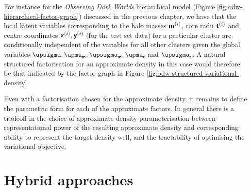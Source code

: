 For instance for the \emph{Observing Dark Worlds} hierarchical model (Figure \ref{fig:odw-hierarchical-factor-graph}) discussed in the previous chapter, we have that the local latent variables corresponding to the halo masses $\boldsymbol{\mathsf{m}}^{(i)}$, core radii $\boldsymbol{\mathsf{t}}^{(i)}$ and centre coordinates $\boldsymbol{\mathsf{x}}^{(i)}, \boldsymbol{\mathsf{y}}^{(i)}$ (for the test set data) for a particular cluster are conditionally independent of the variables for all other clusters given the global variables $\upsigma,\upmu_{\rvar{m}},\upsigma_{\rvar{m}},\upmu_{\rvar{t}}$ and $\upsigma_{\rvar{t}}$. A natural structured factorisation for an approximate density in this case would therefore be that indicated by the factor graph in Figure \ref{fig:odw-structured-variational-density}.

Even with a factorisation chosen for the approximate density, it remains to define the parametric form for each of the approximate factors. In general there is a tradeoff in the choice of approximate density parameterisation between representational power of the resulting approximate density and corresponding ability to represent the target density well, and the tractability of optimising the variational objective.

 



\section{Hybrid approaches}

